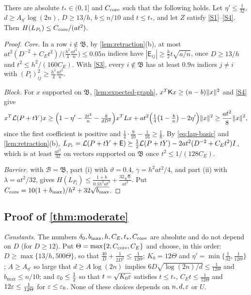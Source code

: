 \begin{lemma}\label{lem:seed-graph}
There are absolute $t_*\in(0,1]$ and $C_{\rm core}$ such that the following
holds. Let $\eta'\le\frac1{32}$, $d\ge A_{\eta'}\log(2n)$, $D\ge13/h$,
$b\le n/10$ and $t\le t_*$, and let $Z$ satisfy \ref{S1}--\ref{S4}. Then
$H(L_{P_t})\le C_{\rm core}/(at^2)$.
\end{lemma}

\begin{proof}
\emph{Core.} In a row $i\notin\mathfrak B$, by \cref{lem:retraction}(b), at most
$at^2(D^{-2}+C_Et^2)\big/\bigl(\frac{h^2}4\frac{at^2}n\bigr)\le0.05n$ indices have
$|\mathsf E_{ij}|\ge\frac h2t\sqrt{a/n}$, once $D\ge13/h$ and
$t^2\le h^2/(160C_E)$. With \ref{S3}, every $i\notin\mathfrak B$ has at least
$0.9n$ indices $j\ne i$ with $(P_t)_{ij}^2\ge\frac{h^2}4\frac{at^2}n$.

\emph{Block.} For $x$ supported on $\mathfrak B$, \cref{lem:expected-graph},
$x^T\mathsf Kx\ge(n-b)\lVert x\rVert^2$ and \ref{S4} give
\[
 x^T\mathcal L(P+tY)x\ge\Bigl(1-\eta'-\tfrac{2t^2}n-\tfrac8{dD^2}\Bigr)x^TLx
 +at^2\Bigl(\tfrac14\bigl(1-\tfrac bn\bigr)-2\eta'\Bigr)\lVert x\rVert^2
 \ge\frac{at^2}8\lVert x\rVert^2 ,
\]
since the first coefficient is positive and $\frac14\cdot\frac9{10}-\frac1{16}\ge\frac18$.
By \eqref{eq:lap-basic} and \cref{lem:retraction}(b),
$L_{P_t}=\mathcal L(P+tY+\mathsf E)\succeq\frac12\mathcal L(P+tY)-2at^2(D^{-2}+C_Et^2)I$,
which is at least $\frac{at^2}{32}$ on vectors supported on $\mathfrak B$ once
$t^2\le1/(128C_E)$.

\emph{Barrier.}  with $\mathcal B=\mathfrak B$, part (i) with
$\vartheta=0.4$, $\gamma=h^2at^2/4$, and part (ii) with $\lambda=at^2/32$, gives
$H(L_{P_t})\le\frac{1+b}{0.1h^2at^2}+\frac{32\sqrt b}{at^2}$. Put
$C_{\rm core}=10(1+b_{\max})/h^2+32\sqrt{b_{\max}}$.
\end{proof}

\subsection{Proof of \texorpdfstring{\cref{thm:moderate}}{Theorem}}

\emph{Constants.} The numbers $\delta_0,b_{\max},h,C_E,t_*,C_{\rm core}$ are
absolute and do not depend on $D$ (for $D\ge12$). Put
$\Theta=\max\{2,C_{\rm core},C_E\}$ and choose, in this order: $D\ge\max\{13/h,
500\Theta\}$, so that $\frac{40}D+\frac1{2D^2}\le\frac1{12\Theta}$; $K_0=12\Theta$
and $\eta'=\min\{\frac1{32},\frac1{12\Theta}\}$; $A\ge A_{\eta'}$ so large that
$d\ge A\log(2n)$ implies $6D\sqrt{\log(2n)/d}\le\frac1{12\Theta}$ and
$b_{\max}\le n/10$; and $\varepsilon_0\le\frac12$ so that $t=\sqrt{K_0\varepsilon}$ satisfies
$t\le t_*$, $C_Et\le\frac1{12\Theta}$ and $12\varepsilon\le\frac1{12\Theta}$ for
$\varepsilon\le\varepsilon_0$. None of these choices depends on $n,d,\varepsilon$ or $U$.

